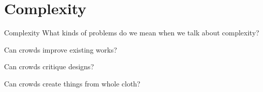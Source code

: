 \documentclass[presentation]{subfiles}
\begin{document}
\section{Complexity}

\begin{frame}{Complexity}
  What kinds of problems do we mean when we talk about complexity?
  \begin{mystepwiseitemize}
    \item Can crowds improve existing works?~\cite{bernsteinSoylent,Kim:2014:CSI:2556288.2556986}
    \item Can crowds critique designs?~\cite{yuanAlmost}
    \item Can crowds create things from whole cloth?~\cite{KimStoria,Kim2017,Hahn:2016:KAB:2858036.2858364,Lasecki:2014:LSR:2661334.2661352}
  \end{mystepwiseitemize}
\end{frame}
\end{document}
